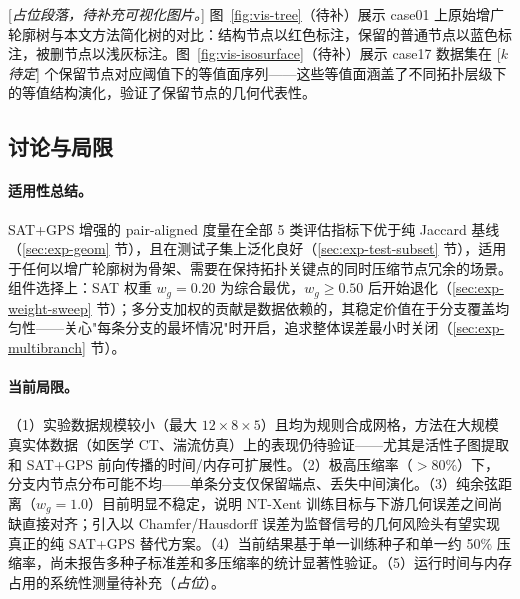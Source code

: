 \documentclass[twocolumn, a4paper, 10pt]{article}
\begin{document}
[\textit{占位段落，待补充可视化图片。}] 图~\ref{fig:vis-tree}（待补）展示 case01 上原始增广轮廓树与本文方法简化树的对比：结构节点以红色标注，保留的普通节点以蓝色标注，被删节点以浅灰标注。图~\ref{fig:vis-isosurface}（待补）展示 case17 数据集在 [\textit{$k$ 待定}] 个保留节点对应阈值下的等值面序列——这些等值面涵盖了不同拓扑层级下的等值结构演化，验证了保留节点的几何代表性。

\subsection{讨论与局限}
\label{sec:exp-discussion}

\paragraph{适用性总结。}SAT+GPS 增强的 pair-aligned 度量在全部 5 类评估指标下优于纯 Jaccard 基线（\ref{sec:exp-geom} 节），且在测试子集上泛化良好（\ref{sec:exp-test-subset} 节），适用于任何以增广轮廓树为骨架、需要在保持拓扑关键点的同时压缩节点冗余的场景。组件选择上：SAT 权重 $w_g{=}0.20$ 为综合最优，$w_g{\geq}0.50$ 后开始退化（\ref{sec:exp-weight-sweep} 节）；多分支加权的贡献是数据依赖的，其稳定价值在于分支覆盖均匀性——关心"每条分支的最坏情况"时开启，追求整体误差最小时关闭（\ref{sec:exp-multibranch} 节）。

\paragraph{当前局限。}（1）实验数据规模较小（最大 $12\times 8\times 5$）且均为规则合成网格，方法在大规模真实体数据（如医学 CT、湍流仿真）上的表现仍待验证——尤其是活性子图提取和 SAT+GPS 前向传播的时间/内存可扩展性。（2）极高压缩率（${>}80\%$）下，分支内节点分布可能不均——单条分支仅保留端点、丢失中间演化。（3）纯余弦距离（$w_g{=}1.0$）目前明显不稳定，说明 NT-Xent 训练目标与下游几何误差之间尚缺直接对齐；引入以 Chamfer/Hausdorff 误差为监督信号的几何风险头有望实现真正的纯 SAT+GPS 替代方案。（4）当前结果基于单一训练种子和单一约 50\% 压缩率，尚未报告多种子标准差和多压缩率的统计显著性验证。（5）运行时间与内存占用的系统性测量待补充（\textit{占位}）。
\end{document}
